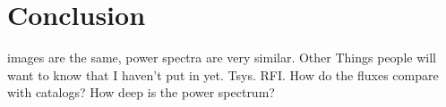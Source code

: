 \section{Conclusion}
images are the same, power spectra are very similar.
Other Things people will want to know that I haven't put in yet. Tsys. RFI. How do the fluxes compare with catalogs? How deep is the power spectrum?